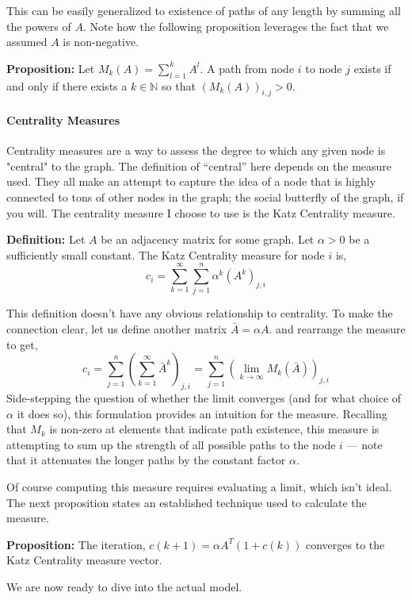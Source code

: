 This can be easily generalized to existence of paths of any length by summing all the powers of \(A.\)
Note how the following proposition leverages the fact that we assumed $A$ is non-negative.

\textbf{Proposition:} Let \(M_k(A) = \sum_{l=1}^k A^l.\) A path from node \(i\) to node \(j\) exists if and only if there exists a \(k \in \mathbb{N}\) so that \((M_k(A))_{i,j} > 0.\)

\paragraph{Centrality Measures}
Centrality measures are a way to assess the degree to which any given node is "central" to the graph.
The definition of ``central'' here depends on the measure used.
They all make an attempt to capture the idea of a node that is highly connected to tons of other nodes in the graph;
the social butterfly of the graph, if you will.
The centrality measure I choose to use is the Katz Centrality measure.

\textbf{Definition:} Let \(A\) be an adjacency matrix for some graph.
Let \(\alpha > 0\) be a sufficiently small constant.
The Katz Centrality measure for node \(i\) is,
\[
  c_i = \sum_{k=1}^{\infty}{ \sum_{j=1}^{n}{ \alpha^k (A^k)_{j,i} } }
\]

This definition doesn't have any obvious relationship to centrality.
To make the connection clear, let us define another matrix \(\bar{A} = \alpha A.\) and rearrange the measure to get,
\[
  c_i = \sum_{j=1}^{n}{ \left( \sum_{k=1}^{\infty} \bar{A}^k \right)_{j,i} } = \sum_{j=1}^{n}{ \left( \lim_{k\to \infty} M_k(\bar{A}) \right)_{j,i}}
\]
Side-stepping the question of whether the limit converges (and for what choice of \(\alpha\) it does so), this formulation provides an intuition for the measure.
Recalling that \(M_k\) is non-zero at elements that indicate path existence, this measure is attempting to sum up the strength of all possible paths to the node \(i\) --- note that it attenuates the longer paths by the constant factor \(\alpha.\)

Of course computing this measure requires evaluating a limit, which isn't ideal.
The next proposition states an established technique used to calculate the measure.

\textbf{Proposition:} The iteration, \(c(k+1) = \alpha A^T(1 + c(k))\) converges to the Katz Centrality measure vector.

We are now ready to dive into the actual model.
